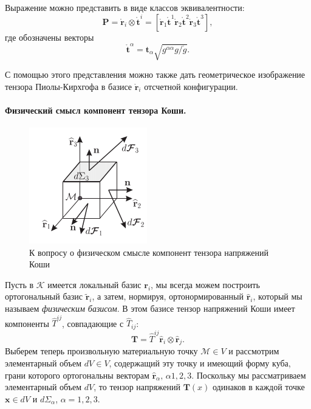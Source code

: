 Выражение можно представить в виде классов эквивалентности:
\begin{equation*}
	\mathbf{P} = \mathring{\mathbf{r}}_i \otimes \mathring{\mathbf{t}}^i = \left[\mathring{\mathbf{r}}_1 \mathring{\mathbf{t}}^1 \mathring{\mathbf{r}}_2 \mathring{\mathbf{t}}^2 \mathring{\mathbf{r}}_3 \mathring{\mathbf{t}}^3\right], 
\end{equation*}
где обозначены векторы
\begin{equation*}
	\mathring{\mathbf{t}}^{\alpha} = \mathbf{t}_{\alpha} \sqrt{g^{\alpha \alpha} g / \mathring{g}}.
\end{equation*}

С помощью этого представления можно также дать геометрическое изображение тензора Пиолы-Кирхгофа в базисе $\mathring{\mathbf{r}}_i$ отсчетной конфигурации.

\paragraph{Физический смысл компонент тензора Коши.}


\begin{figure}
	\centering
	\includegraphics[width=0.7\linewidth]{img/que18_2}
	\caption{К вопросу о физическом смысле компонент тензора напряжений Коши}
	\label{fig:que18_2}
\end{figure}

Пусть в $\mathcal{K}$ имеется локальный базис $\mathbf{r}_i$, мы всегда можем построить ортогональный базис $\widetilde{\mathbf{r}}_i$, а затем, нормируя, ортонормированный $\widehat{\mathbf{r}}_i$, который мы называем \textit{физическим базисом}. В этом базисе тензор напряжений Коши имеет компоненты $\widehat{T}^{ij}$, совпадающие с $\widehat{T}_{ij}$: 
\begin{equation*}
	\mathbf{T} = \widehat{T}^{i j} \widehat{\mathbf{r}}_i \otimes \widehat{\mathbf{r}}_j.
\end{equation*}
Выберем теперь произвольную материальную точку $\mathcal{M} \in V$ и рассмотрим элементарный объем $dV \in V$, содержащий эту точку и имеющий форму куба, грани которого ортогональны векторам $\widehat{\mathbf{r}}_{\alpha}, \, \alpha 1, 2, 3$. Поскольку мы рассматриваем элементарный объем $dV$, то тензор напряжений $\mathbf{T}(x)$ одинаков в каждой точке $\mathbf{x} \in dV$ и $d\Sigma_{\alpha}$, $\alpha = 1, 2, 3$. 

